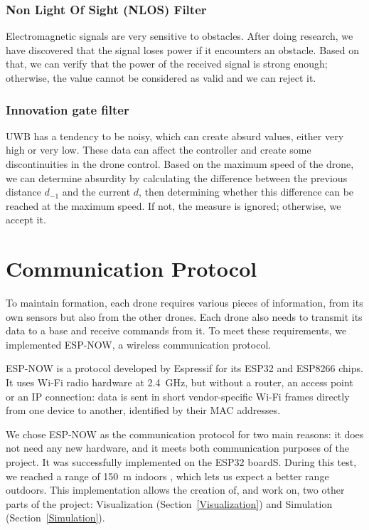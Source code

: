 \documentclass[conference]{IEEEtran}
\begin{document}
\subsubsection{Non Light Of Sight (NLOS) Filter}
Electromagnetic signals are very sensitive to obstacles. After doing research,
we have discovered that the signal loses power if it encounters an obstacle.
Based on that, we can verify that the power of the received signal is strong
enough; otherwise, the value cannot be considered as valid and we can reject it.

\subsubsection{Innovation gate filter}
UWB has a tendency to be noisy, which can create absurd values, either very
high or very low. These data can affect the controller and create some
discontinuities in the drone control. Based on the maximum speed of the drone,
we can determine absurdity by calculating the difference between the previous
distance $d_{-1}$ and the current $d$, then determining whether this difference
can be reached at the maximum speed. If not, the measure is ignored; otherwise,
we accept it.

\section{Communication Protocol} \label{COM_Protocol}

To maintain formation, each drone requires various pieces of information, from
its own sensors but also from the other drones. Each drone also needs to
transmit its data to a base and receive commands from it. To meet these
requirements, we implemented ESP-NOW, a wireless communication protocol. 

ESP-NOW is a protocol developed by Espressif for its ESP32 and ESP8266 chips.
It uses Wi-Fi radio hardware at 2.4~GHz, but without a router, an access point
or an IP connection: data is sent in short vendor-specific Wi-Fi frames
directly from one device to another, identified by their MAC addresses. 

We chose ESP-NOW as the communication protocol for two main reasons: it does
not need any new hardware, and it meets both communication purposes of the project.
It was successfully implemented on the ESP32 boardS. During this test, we reached a range of 150~m indoors , which lets us expect a better range outdoors.
This implementation allows the creation of, and work on, two other parts of the project: Visualization (Section~\ref{Visualization}) and Simulation (Section~\ref{Simulation}).
\end{document}
